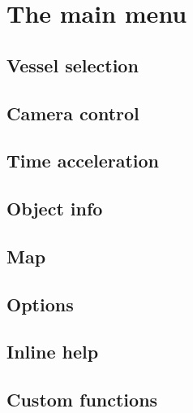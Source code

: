 \documentclass[Orbiter User Manual.tex]{subfiles}
\begin{document}
\section{The main menu}

\subsection{Vessel selection}

\subsection{Camera control}

\subsection{Time acceleration}

\subsection{Object info}

\subsection{Map}

\subsection{Options}

\subsection{Inline help}

\subsection{Custom functions}
\end{document}
